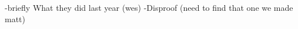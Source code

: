 \color{red}
-briefly What they did last year (wes) 
-Disproof (need to find that one we made matt)
\color{black}
